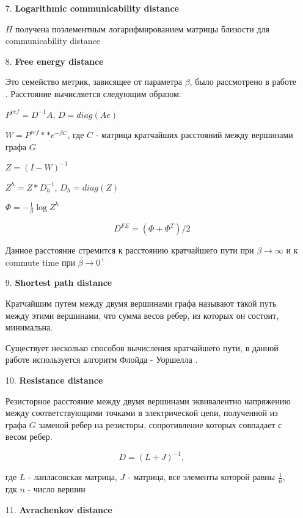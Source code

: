 \begin{itemize}
\item[7.] \textbf{Logarithmic communicability distance}

$H$ получена поэлементным логарифмированием матрицы близости для communicability distance

\item[8.] \textbf{Free energy distance}

Это семейство метрик, зависящее от параметра $\beta$, было рассмотрено в работе \cite{kivimaki2014developments}. Расстояние вычисляется следующим образом:

$P^{ref} = D^{-1} A$, $D = diag(Ae)$

$W = P^{ref} ** e^{-\beta C}$, где $C$ - матрица кратчайших расстояний между вершинами графа $G$

$Z = (I-W)^{-1}$

$Z^h = Z * D_h^{-1}$, $D_h = diag(Z)$

$\Phi = -\frac{1}{\beta} \log Z^h$

\begin{equation}
D^{FE} = (\Phi + \Phi ^T)/ 2
\end{equation}

Данное расстояние стремится к расстоянию кратчайшего пути при $\beta \rightarrow \infty$ и к commute time при $\beta \rightarrow 0^+$

\item[9.] \textbf{Shortest path distance}

Кратчайшим путем между двумя вершинами графа называют такой путь между этими вершинами, что сумма весов ребер, из которых он состоит, минимальна.

Существует несколько способов вычисления кратчайшего пути, в данной работе используется алгоритм Флойда - Уоршелла \cite{floyd1962algorithm}.

\item[10.] \textbf{Resistance distance}

Резисторное расстояние между двумя вершинами эквивалентно напряжению между соответствующими точками в электрической цепи, полученной из графа $G$ заменой ребер на резисторы, сопротивление которых совпадает с весом ребер. 

\begin{equation}
D = (L + J)^{-1},
\end{equation}
 
где $L$ - лапласовская матрица, $J$ - матрица, все элементы которой равны $\frac {1}{n}$, гдк $n$ - число вершин

\item[11.] \textbf{Avrachenkov distance}


\end{itemize}
